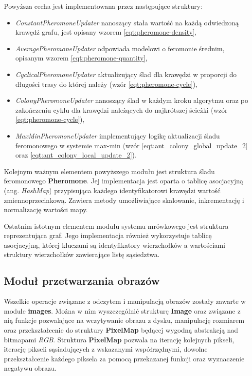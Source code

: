 {{{            Powyższa cecha jest implementowana przez następujące struktury:

            \begin{itemize}
                \item \textit{ConstantPheromoneUpdater} nanoszący stała wartość na każdą odwiedzoną krawędź grafu, jest
                opisany wzorem \ref{eqt:pheromone-density},
                \item \textit{AveragePheromoneUpdater} odpowiada modelowi o feromonie średnim, opisanym wzorem \ref{eqt:pheromone-quantity},
                \item \textit{CyclicalPheromoneUpdater} aktualizujący ślad dla krawędzi w proporcji do długości trasy do
                której należy (wzór \ref{eqt:pheromone-cycle}),
                \item \textit{ColonyPheromoneUpdater} nanoszący ślad w każdym kroku algorytmu oraz po zakończeniu cyklu
                dla krawędzi należących do najkrótszej ścieżki (wzór \ref{eqt:pheromone-cycle}),
                \item \textit{MaxMinPheromoneUpdater} implementujący logikę aktualizacji śladu feromonowego w systemie
                max-min (wzór \ref{eqt:ant_colony_global_update_2} oraz \ref{eqt:ant_colony_local_update_2}).
            \end{itemize}

            Kolejnym ważnym elementem powyższego modułu jest struktura śladu feromonowego \textbf{Pheromone}. Jej
            implementacja jest oparta o tablicę asocjacyjną (ang. \textit{HashMap}) przypisująca każdego
            identyfikatorowi krawędzi wartość zmiennoprzecinkową. Zawiera metody umożliwiające skalowanie,
            inkrementację i normalizację wartości mapy.

            Ostatnim istotnym elementem modułu systemu mrówkowego jest struktura reprezentująca graf. Jego implementacja
            również wykorzystuje tablicę asocjacyjną, której kluczami są identyfikatory wierzchołków a wartościami
            struktury wierzchołków zawierające listę sąsiedztwa.
        }

        \subsection{Moduł przetwarzania obrazów}
        {
            Wszelkie operacje związane z odczytem i manipulacją obrazów zostały zawarte w module \textbf{images}. Można
            w nim wyszczególnić strukturę \textbf{Image} oraz związane z nią funkcje pozwalające na wczytywanie obrazu z
            dysku, manipulację rozmiarem oraz przekształcenie do struktury \textbf{PixelMap} będącej wygodną abstrakcją
            nad bitmapami \textit{RGB}. Struktura \textbf{PixelMap} pozwala na iterację kolejnych pikseli, iterację
            pikseli sąsiadujących z wskazanymi współrzędnymi, dowolne przekształcenie każdego piksela za pomocą
            przekazanej funkcji oraz wyznaczenie negatywu obrazu.

}}}
